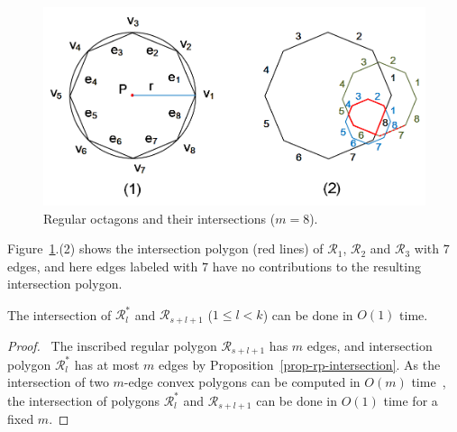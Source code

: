 \begin{figure}[tb!]
	\centering
	\includegraphics[scale=0.85]{figures/Fig-polygons.png}
	\vspace{0ex}
	\caption{\small Regular octagons and their intersections ($m =8$).}
	\vspace{-1ex}
	\label{fig:polygons}
\end{figure}

Figure~\ref{fig:polygons}.(2) shows the intersection polygon (red lines) of $\mathcal{R}_1$, $\mathcal{R}_2$ and $\mathcal{R}_3$ with $7$ edges, and here edges labeled with $7$ have no contributions to the resulting intersection polygon.

\begin{prop}
\label{prop-cpi-time}
The intersection of $\mathcal{R}^*_l$ and $\mathcal{R}_{s+l+1}$ ($ 1\le l< k$) can be done in $O(1)$
time.
\end{prop}

\begin{proof}\
The inscribed regular polygon $\mathcal{R}_{s+l+1}$ has $m$ edges, and intersection polygon $\mathcal{R}^*_l$ has at most $m$ edges by Proposition~\ref{prop-rp-intersection}.
As the intersection of two $m$-edge convex polygons can be computed in $O(m)$ time~\cite{ORourke:Intersection}, the intersection of polygons $\mathcal{R}^*_l$ and $\mathcal{R}_{s+l+1}$ can be done in $O(1)$ time for a fixed $m$. \eop
\end{proof}








